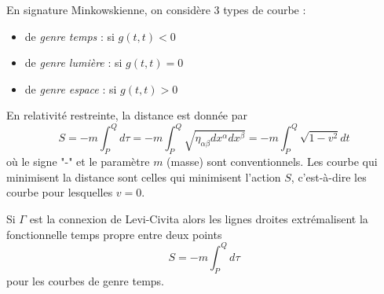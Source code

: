 \documentclass[a4paper,11pt]{report}
\begin{document}
            \begin{defn}
                En signature Minkowskienne, on considère 3 types de courbe :
                \begin{itemize}[label = \textbullet]
                    \item de \textit{genre temps} : si $g(t,t)<0$
                    \item de \textit{genre lumière} : si $g(t,t)=0$
                    \item de \textit{genre espace} : si $g(t,t)>0$
                \end{itemize}
            \end{defn}
            
            \begin{exmp}
                En relativité restreinte, la distance est donnée par
                \begin{equation}
                    S = -m\int_P^Qd\tau = -m\int_P^Q\sqrt{\eta_{\alpha\beta}dx^\alpha dx^\beta} = -m\int_P^Q\sqrt{1-v^2}dt
                \end{equation}
                où le signe "-" et le paramètre $m$ (masse) sont conventionnels. Les courbe qui minimisent la distance sont celles qui minimisent l'action $S$, c'est-à-dire les courbe pour lesquelles $v=0$.
            \end{exmp}
            
            \begin{thm}\begin{leftbar}
                Si $\Gamma$ est la connexion de Levi-Civita alors les lignes droites extrémalisent  la fonctionnelle temps propre entre deux points
                \begin{equation}
                    S = -m\int_P^Qd\tau
                \end{equation}
                pour les courbes de genre temps.
            \end{leftbar}\end{thm}
            
\end{document}
